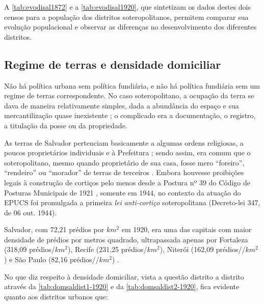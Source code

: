 A \autoref{tab:evodisal1872} e a \autoref{tab:evodisal1920}, que sintetizam os dados destes dois censos para a população dos distritos soteropolitanos, permitem comparar sua evolução populacional e observar as diferenças no desenvolvimento dos diferentes distritos. 




\subsection{Regime de terras e densidade domiciliar}\label{subsec:1.4.2}

Não há política urbana sem política fundiária, e não há política fundiária sem um regime de terras correspondente. No caso soteropolitano, a ocupação da terra se dava de maneira relativamente simples, dada a abundância do espaço e sua mercantilização quase inexistente \cite[p.~25]{MOURA1990}; o complicado era a documentação, o registro, a titulação da posse ou da propriedade.

As terras de Salvador pertenciam basicamente a algumas ordens religiosas, a poucos proprietários individuais e à Prefeitura \cite{CEDURB1978}; sendo assim, era comum que o soteropolitano, mesmo quando proprietário de sua casa, fosse mero ``foreiro'', ``rendeiro'' ou ``morador'' de terras de terceiros \cite[p.~139]{BRANDAO1980}. Embora houvesse proibições legais à construção de cortiços pelo menos desde a Postura nº 39 do Código de Posturas Municipais de 1921 \cite{PREFEITURA1921}, somente em 1944, no contexto da atuação do EPUCS foi promulgada a primeira \textit{lei anti-cortiço} soteropolitana (Decreto-lei 347, de 06 out. 1944).

Salvador, com 72,21 prédios por $km^{2}$ em 1920, era uma das capitais com maior densidade de prédios por metros quadrado, ultrapassada apenas por Fortaleza (318,09 prédios/$km^{2}$), Recife (231,25 prédios/$km^{2}$), Niterói (162,09 prédios//$km^{2}$) e São Paulo (82,16 prédios//$km^{2}$) \cite[p.~XV]{brasil_censo46_1920}.

% 

No que diz respeito à densidade domiciliar, vista a questão distrito a distrito através da \autoref{tab:domsaldist1-1920} e da \autoref{tab:domsaldist2-1920}, fica evidente quanto aos distritos urbanos que:

